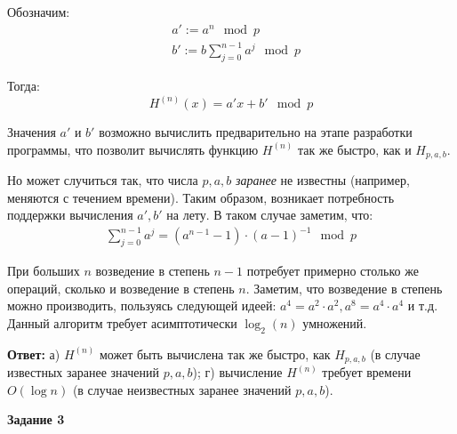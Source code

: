\documentclass[12pt, a4paper]{extarticle}
\newenvironment*{dummyenv}{}{}
\newcommand{\mysection}[1]{
    \addcontentsline{toc}{section}{#1}
    \begin{dummyenv}
        \bfseries\large #1
    \end{dummyenv}
}
\begin{document}
Обозначим:
\begin{equation*}
    \begin{split}
        & a' := a^n \mod p \\
        & b' := b \sum_{j=0}^{n - 1} a^j \mod p
    \end{split}
\end{equation*}

Тогда:
\begin{equation*}
    H^{(n)}(x) = a'x + b' \mod p
\end{equation*}

Значения $a'$ и $b'$ возможно вычислить предварительно на этапе разработки программы, что позволит вычислять функцию
$H^{(n)}$ так же быстро, как и $H_{p,a,b}$.

Но может случиться так, что числа $p,a,b$ \textit{заранее} не известны (например, меняются с течением времени). 
Таким образом, возникает потребность поддержки вычисления $a', b'$ на лету. В таком случае заметим, что:
\begin{equation*}
    \begin{split}
        \sum_{j=0}^{n-1}a^j = (a^{n-1} - 1) \cdot (a - 1)^{-1} \mod p
    \end{split}
\end{equation*}

При больших $n$ возведение в степень $n-1$ потребует примерно столько же операций, сколько и возведение в степень $n$.
Заметим, что возведение в степень можно производить, пользуясь следующей идеей: $a^4 = a^2 \cdot a^2, 
a^8 = a^4 \cdot a^4$ и т.д. Данный алгоритм требует асимптотически $\log _2(n)$ умножений.

\textbf{Ответ:} а) $H^{(n)}$ может быть вычислена так же быстро, как $H_{p,a,b}$ (в случае известных заранее значений 
$p,a,b$); г) вычисление $H^{(n)}$ требует времени $O(\log n)$ (в случае неизвестных заранее значений $p,a,b$).
\\

\mysection{Задание 3}
\end{document}
